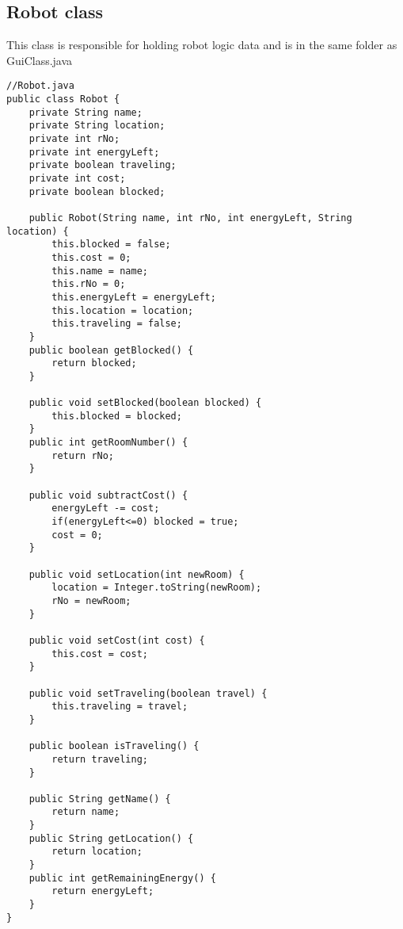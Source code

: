 \subsection{Robot class}
This class is responsible for holding robot logic data and is in the same folder as GuiClass.java
\begin{lstlisting}
//Robot.java
public class Robot {
	private String name;
	private String location;
	private int rNo;
	private int energyLeft;
	private boolean traveling;
	private int cost;
	private boolean blocked;

	public Robot(String name, int rNo, int energyLeft, String location) {
		this.blocked = false;
		this.cost = 0;
		this.name = name;
		this.rNo = 0;
		this.energyLeft = energyLeft;
		this.location = location;
		this.traveling = false;
	}
	public boolean getBlocked() {
		return blocked;
	}

	public void setBlocked(boolean blocked) {
		this.blocked = blocked;
	}
	public int getRoomNumber() {
		return rNo;
	}

	public void subtractCost() {
		energyLeft -= cost;
		if(energyLeft<=0) blocked = true;
		cost = 0;
	}

	public void setLocation(int newRoom) {
		location = Integer.toString(newRoom);
		rNo = newRoom;
	}

	public void setCost(int cost) {
		this.cost = cost;
	}

	public void setTraveling(boolean travel) {
		this.traveling = travel;
	}

	public boolean isTraveling() {
		return traveling;
	}

	public String getName() {
		return name;
	}
	public String getLocation() {
		return location;
	}
	public int getRemainingEnergy() {
		return energyLeft;
	}
}
\end{lstlisting}
